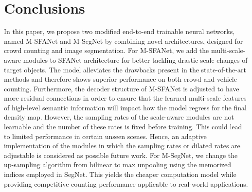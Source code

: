 \documentclass[10pt, conference, a4paper]{IEEEtran}
\begin{document}
\section{Conclusions}
In this paper, we propose two modified end-to-end trainable neural networks, named M-SFANet and M-SegNet by combining novel architectures, designed for crowd counting and image segmentation. For M-SFANet, we add the multi-scale-aware modules to SFANet architecture for better tackling drastic scale changes of target objects. The model alleviates the drawbacks present in the state-of-the-art methods and therefore shows superior performance on both crowd and vehicle counting. Furthermore, the decoder structure of M-SFANet is adjusted to have more residual connections in order to ensure that the learned multi-scale features of high-level semantic information will impact how the model regress for the final density map. However, the sampling rates of the scale-aware modules are not learnable and the number of these rates is fixed before training. This could lead to limited performance in certain unseen scenes. Hence, an adaptive implementation of the modules in which the sampling rates or dilated rates are adjustable is considered as possible future work. For M-SegNet, we change the up-sampling algorithm from bilinear to max unpooling using the memorized indices employed in SegNet. This yields the cheaper computation model while providing competitive counting performance applicable to real-world applications.
\label{conclusion_para}

{\small


}
\end{document}
